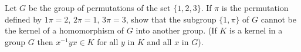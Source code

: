 Let $G$ be the group of permutations of the set $\{1, 2, 3\}$. If $\pi$ is the permutation defined by $1\pi = 2$, $2\pi = 1$, $3\pi = 3$, show that the subgroup $\{1, \pi\}$ of $G$ cannot be the kernel of a homomorphism of $G$ into another group. (If $K$ is a kernel in a group $G$ then $x^{-1}yx \in K$ for all $y$ in $K$ and all $x$ in $G$).

